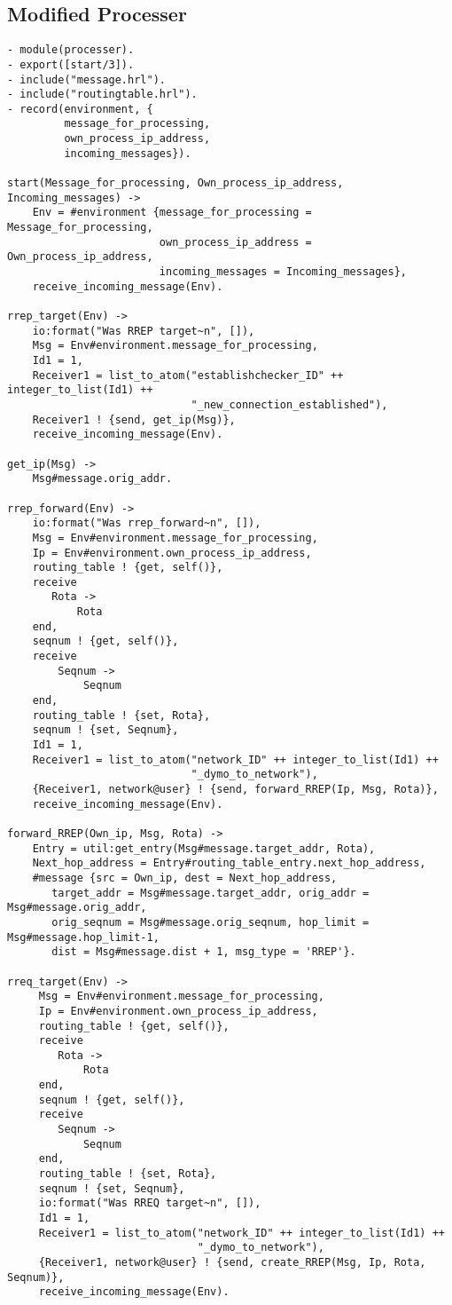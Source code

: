 \subsection*{Modified Processer}

\footnotesize
\begin{verbatim}
- module(processer).
- export([start/3]).
- include("message.hrl").
- include("routingtable.hrl").
- record(environment, {
         message_for_processing,
         own_process_ip_address,
         incoming_messages}).

start(Message_for_processing, Own_process_ip_address, Incoming_messages) -> 
    Env = #environment {message_for_processing = Message_for_processing, 
                        own_process_ip_address = Own_process_ip_address, 
                        incoming_messages = Incoming_messages},
    receive_incoming_message(Env).

rrep_target(Env) ->
    io:format("Was RREP target~n", []),
    Msg = Env#environment.message_for_processing,
    Id1 = 1,
    Receiver1 = list_to_atom("establishchecker_ID" ++ integer_to_list(Id1) ++ 
                             "_new_connection_established"),
    Receiver1 ! {send, get_ip(Msg)},    
    receive_incoming_message(Env).

get_ip(Msg) ->
    Msg#message.orig_addr.

rrep_forward(Env) -> 
    io:format("Was rrep_forward~n", []),
    Msg = Env#environment.message_for_processing,
    Ip = Env#environment.own_process_ip_address,
    routing_table ! {get, self()},
    receive 
       Rota -> 
           Rota
    end,
    seqnum ! {get, self()},
    receive 
        Seqnum -> 
            Seqnum
    end,     
    routing_table ! {set, Rota},
    seqnum ! {set, Seqnum},
    Id1 = 1,
    Receiver1 = list_to_atom("network_ID" ++ integer_to_list(Id1) ++ 
                             "_dymo_to_network"),
    {Receiver1, network@user} ! {send, forward_RREP(Ip, Msg, Rota)},
    receive_incoming_message(Env).

forward_RREP(Own_ip, Msg, Rota) ->
    Entry = util:get_entry(Msg#message.target_addr, Rota),
    Next_hop_address = Entry#routing_table_entry.next_hop_address,
    #message {src = Own_ip, dest = Next_hop_address, 
       target_addr = Msg#message.target_addr, orig_addr = Msg#message.orig_addr, 
       orig_seqnum = Msg#message.orig_seqnum, hop_limit = Msg#message.hop_limit-1, 
       dist = Msg#message.dist + 1, msg_type = 'RREP'}.

rreq_target(Env) -> 
     Msg = Env#environment.message_for_processing,
     Ip = Env#environment.own_process_ip_address,
     routing_table ! {get, self()},
     receive 
        Rota -> 
            Rota
     end,
     seqnum ! {get, self()},
     receive 
        Seqnum -> 
            Seqnum
     end,
     routing_table ! {set, Rota},
     seqnum ! {set, Seqnum},     
     io:format("Was RREQ target~n", []),     
     Id1 = 1,
     Receiver1 = list_to_atom("network_ID" ++ integer_to_list(Id1) ++ 
                              "_dymo_to_network"),
     {Receiver1, network@user} ! {send, create_RREP(Msg, Ip, Rota, Seqnum)},
     receive_incoming_message(Env).


\end{verbatim}

